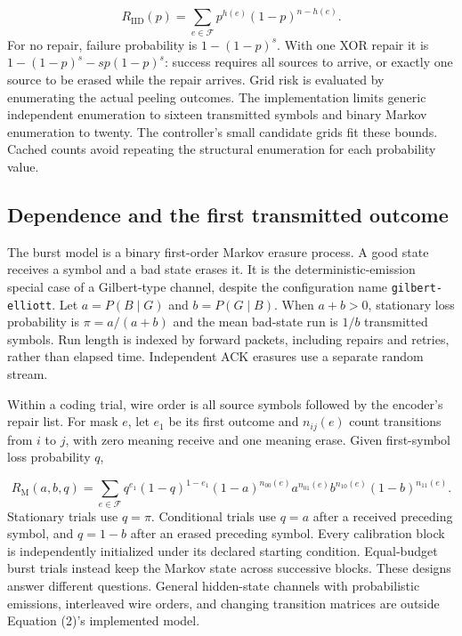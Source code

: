 \documentclass[11pt,a4paper]{article}
\begin{document}
\[
R_{\mathrm{IID}}(p)=\sum_{e\in\mathcal{F}}p^{h(e)}(1-p)^{n-h(e)}. \tag{1}
\]
For no repair, failure probability is $1-(1-p)^s$. With one XOR repair it is $1-(1-p)^s-sp(1-p)^s$: success requires all sources to arrive, or exactly one source to be erased while the repair arrives. Grid risk is evaluated by enumerating the actual peeling outcomes. The implementation limits generic independent enumeration to sixteen transmitted symbols and binary Markov enumeration to twenty. The controller's small candidate grids fit these bounds. Cached counts avoid repeating the structural enumeration for each probability value.

\subsection{Dependence and the first transmitted outcome}
The burst model is a binary first-order Markov erasure process. A good state receives a symbol and a bad state erases it. It is the deterministic-emission special case of a Gilbert-type channel, despite the configuration name \texttt{gilbert-\allowbreak{}elliott}. Let $a=P(B\mid G)$ and $b=P(G\mid B)$. When $a+b>0$, stationary loss probability is $\pi=a/(a+b)$ and the mean bad-state run is $1/b$ transmitted symbols. Run length is indexed by forward packets, including repairs and retries, rather than elapsed time. Independent ACK erasures use a separate random stream.

Within a coding trial, wire order is all source symbols followed by the encoder's repair list. For mask $e$, let $e_1$ be its first outcome and $n_{ij}(e)$ count transitions from $i$ to $j$, with zero meaning receive and one meaning erase. Given first-symbol loss probability $q$,

\[
R_{\mathrm{M}}(a,b,q)=\sum_{e\in\mathcal{F}}q^{e_1}(1-q)^{1-e_1}(1-a)^{n_{00}(e)}a^{n_{01}(e)}b^{n_{10}(e)}(1-b)^{n_{11}(e)}. \tag{2}
\]
Stationary trials use $q=\pi$. Conditional trials use $q=a$ after a received preceding symbol, and $q=1-b$ after an erased preceding symbol. Every calibration block is independently initialized under its declared starting condition. Equal-budget burst trials instead keep the Markov state across successive blocks. These designs answer different questions. General hidden-state channels with probabilistic emissions, interleaved wire orders, and changing transition matrices are outside Equation (2)'s implemented model.
\end{document}

